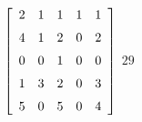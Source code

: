 {$\left[ \begin {array}{ccccc} 2&1&1&1&1\\\noalign{\medskip}4&1&2&0&2
\\\noalign{\medskip}0&0&1&0&0\\\noalign{\medskip}1&3&2&0&3
\\\noalign{\medskip}5&0&5&0&4\end {array} \right] $} 
{$29$}



  

